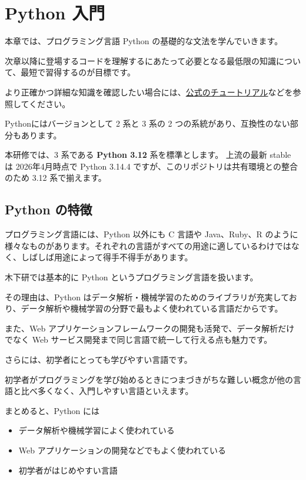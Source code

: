 \chapter{Python 入門}


本章では、プログラミング言語 Python の基礎的な文法を学んでいきます。

次章以降に登場するコードを理解するにあたって必要となる最低限の知識について、最短で習得するのが目標です。

より正確かつ詳細な知識を確認したい場合には、\href{https://docs.python.jp/3/tutorial/index.html}{公式のチュートリアル}などを参照してください。


Pythonにはバージョンとして 2 系と 3 系の 2 つの系統があり、互換性のない部分もあります。

本研修では、3 系である \textbf{Python 3.12} 系を標準とします。
上流の最新 stable は 2026年4月時点で Python 3.14.4 ですが、このリポジトリは共有環境との整合のため 3.12 系で揃えます。


\section{Python の特徴}


プログラミング言語には、Python 以外にも C 言語や Java、Ruby、R のように様々なものがあります。それぞれの言語がすべての用途に適しているわけではなく、しばしば用途によって得手不得手があります。


木下研では基本的に Python というプログラミング言語を扱います。

その理由は、Python はデータ解析・機械学習のためのライブラリが充実しており、データ解析や機械学習の分野で最もよく使われている言語だからです。

また、Web アプリケーションフレームワークの開発も活発で、データ解析だけでなく Web サービス開発まで同じ言語で統一して行える点も魅力です。


さらには、初学者にとっても学びやすい言語です。

初学者がプログラミングを学び始めるときにつまづきがちな難しい概念が他の言語と比べ多くなく、入門しやすい言語といえます。


まとめると、Python には


\begin{itemize}
\item データ解析や機械学習によく使われている
\item Web アプリケーションの開発などでもよく使われている
\item 初学者がはじめやすい言語
\end{itemize}


